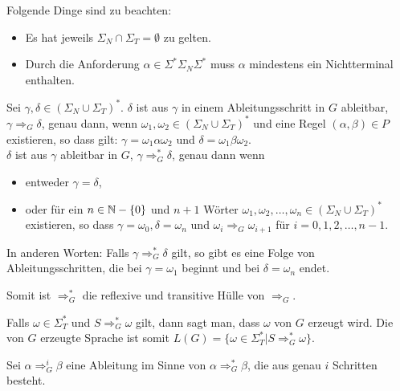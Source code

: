 \begin{remark}
Folgende Dinge sind zu beachten:
\begin{itemize}
  \item Es hat jeweils $\Sigma_N \cap \Sigma_T = \emptyset$ zu gelten.
  \item Durch die Anforderung $\alpha \in \Sigma^* \Sigma_N \Sigma^*$ muss $\alpha$ mindestens ein Nichtterminal enthalten.\\
\end{itemize}
\end{remark}

\begin{definition}
Sei $\gamma, \delta \in (\Sigma_N \cup \Sigma_T)^*$. $\delta$ ist aus $\gamma$ in einem Ableitungsschritt in $G$ ableitbar, $\gamma \Rightarrow_G \delta$, genau dann, wenn $\omega_1, \omega_2 \in (\Sigma_N \cup \Sigma_T)^*$ und eine Regel $(\alpha, \beta) \in P$ existieren, so dass gilt: $\gamma = \omega_1 \alpha \omega_2$ und $\delta = \omega_1 \beta \omega_2$.\\

$\delta$ ist aus $\gamma$ ableitbar in $G$, $\gamma \Rightarrow_G^* \delta$, genau dann wenn
\begin{itemize}
  \item entweder $\gamma = \delta$,
  \item oder für ein $n \in \mathbb{N} - \{0\}$ und $n+1$ Wörter $\omega_1, \omega_2, \ldots, \omega_n \in (\Sigma_N \cup \Sigma_T)^*$ existieren, so dass $\gamma = \omega_0, \delta = \omega_n$ und $\omega_i \Rightarrow_G \omega_{i+1}$ für $i = 0, 1, 2, \ldots, n - 1$.
\end{itemize}
In anderen Worten: Falls $\gamma \Rightarrow_G^* \delta$ gilt, so gibt es eine Folge von Ableitungsschritten, die bei $\gamma = \omega_1$ beginnt und bei $\delta = \omega_n$ endet.

Somit ist $\Rightarrow_G^*$ die reflexive und transitive Hülle von $\Rightarrow_G$.\\
\end{definition}

\begin{definition}
Falls $\omega \in \Sigma_T^*$ und $S \Rightarrow_G^* \omega$ gilt, dann sagt man, dass $\omega$ von $G$ erzeugt wird. Die von $G$ erzeugte Sprache ist somit $L(G) = \{\omega \in \Sigma_T^* | S \Rightarrow_G^* \omega\}$.\\
\end{definition}

\begin{remark}
Sei $\alpha \Rightarrow_G^i \beta$ eine Ableitung im Sinne von $\alpha \Rightarrow_G^* \beta$, die aus genau $i$ Schritten besteht.
\end{remark}


